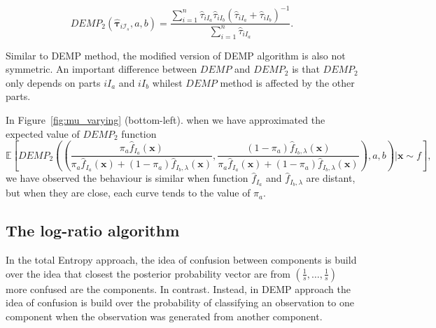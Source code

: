 \documentclass[10pt, a4paper]{article}
\newcommand{\m}[1]{\boldsymbol{#1}}
\begin{document}
\begin{equation}\label{demp_criteria}
DEMP_2(\hat{\m \tau}_{i \mathcal{I}_s}, a, b) =\frac{ \sum_{i=1}^n \hat{\tau}_{iI_a} \hat{\tau}_{iI_b}(\hat{\tau}_{iI_a} + \hat{\tau}_{iI_b})^{-1}  }{\sum_{i=1}^n \hat{\tau}_{iI_a} }.
\end{equation}

Similar to DEMP method, the modified version of DEMP algorithm is also not symmetric. An important difference between $DEMP$ and $DEMP_2$ is that $DEMP_2$ only depends on parts  $iI_a$ and $iI_b$ whilest $DEMP$ method is affected by the other parts.

In Figure~\ref{fig:mu_varying} (bottom-left). when we have approximated the expected value of $DEMP_2$ function
\[
\mathbb{E}\left[DEMP_2 \left(
 \left( 
 \frac{\pi_a \hat{f}_{I_a}(\m x)}{\pi_a \hat{f}_{I_a}(\m x) + (1-\pi_a) \hat{f}_{I_b, \lambda}(\m x)}, 
 \frac{(1-\pi_a) \hat{f}_{I_b, \lambda}(\m x)}{\pi_a \hat{f}_{I_a}(\m x) + (1-\pi_a) \hat{f}_{I_b, \lambda}(\m x)} \right), a, b\right) | \m x \sim f \right],
\]
we have observed the behaviour is similar when function $\hat{f}_{I_a}$ and $\hat{f}_{I_b, \lambda}$ are distant, but when they are close, each curve tends to the value of $\pi_a$.


%
%
%
%
%



\subsection*{The log-ratio algorithm}

In the total Entropy approach, the idea of confusion between components is build over the idea that closest the posterior probability vector are from $(\frac{1}{s}, \dots, \frac{1}{s})$ more confused are the components. In contrast. Instead, in DEMP approach the idea of confusion is build over the probability of classifying an observation to one component when the observation was generated from another component.
\end{document}
